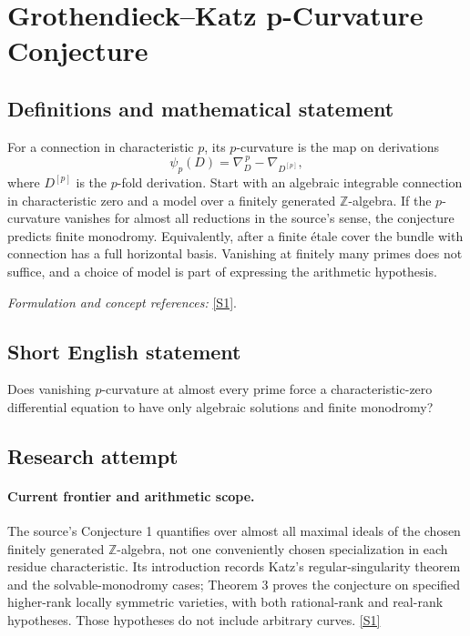 \documentclass[11pt,a4paper]{article}
\newcommand{\Z}{\mathbb{Z}}
\newcommand{\sref}[2]{\hyperlink{source:#1:#2}{[S#2]}}
\newif\ifshowcatalogue
\newcommand{\cataloguescope}[1]{\ifshowcatalogue
 \paragraph{Exact scope in the supplied catalogue.}
 \begin{quote}\small #1\end{quote}\fi}
\numberwithin{equation}{section}
\begin{document}
\setcounter{section}{0}
\clearpage
\section*{\texorpdfstring{Grothendieck–Katz p-Curvature Conjecture}{Grothendieck–Katz p-Curvature Conjecture}}\label{30006976}
\subsection{Definitions and mathematical statement}
For a connection in characteristic $p$, its $p$-curvature is the map on derivations
\[
 \psi_p(D)=\nabla_D^{\,p}-\nabla_{D^{[p]}},
\]
where $D^{[p]}$ is the $p$-fold derivation. Start with an algebraic integrable connection in characteristic zero and a model over a finitely generated $\Z$-algebra. If the $p$-curvature vanishes for almost all reductions in the source's sense, the conjecture predicts finite monodromy. Equivalently, after a finite étale cover the bundle with connection has a full horizontal basis. Vanishing at finitely many primes does not suffice, and a choice of model is part of expressing the arithmetic hypothesis.
\par\smallskip\textit{Formulation and concept references:} \sref{30006976}{1}.
\cataloguescope{Let X be a smooth connected complex variety and (V,\ensuremath{\nabla}) an algebraic vector bundle with integrable connection, spread out over a finitely generated Z-algebra. Prove that if the reductions have zero p-curvature for almost all primes, then (V,\ensuremath{\nabla}) has a full set of algebraic solutions, equivalently becomes trivial on a finite étale cover and has finite monodromy.}
\subsection{Short English statement}
Does vanishing $p$-curvature at almost every prime force a characteristic-zero differential equation to have only algebraic solutions and finite monodromy?
\subsection{Research attempt}

\paragraph{Current frontier and arithmetic scope.}
The source's Conjecture 1 quantifies over almost all maximal ideals of the
chosen finitely generated $\Z$-algebra, not one conveniently chosen
specialization in each residue characteristic. Its introduction records
Katz's regular-singularity theorem and the solvable-monodromy cases;
Theorem 3 proves the conjecture on specified higher-rank locally symmetric
varieties, with both rational-rank and real-rank hypotheses. Those hypotheses
do not include arbitrary curves. \sref{30006976}{1}
\end{document}
